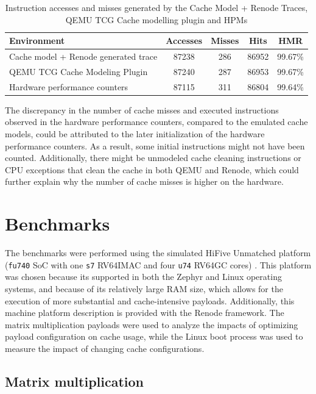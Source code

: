 \begin{table}[h!]
\centering
\begin{tabular}{|l|c|c|c|c|}
\hline
\textbf{Environment} & \textbf{Accesses} & \textbf{Misses} & \textbf{Hits} & \textbf{HMR} \\ \hline
Cache model + Renode generated trace    & 87238        & 286         & 86952 & 99.67\%    \\ \hline
QEMU TCG Cache Modeling Plugin          & 87240        & 287         & 86953 & 99.67\%    \\ \hline
Hardware performance counters           & 87115        & 311         & 86804 & 99.64\%    \\ \hline
\end{tabular}
\caption{Instruction accesses and misses generated by the Cache Model + Renode Traces, QEMU TCG Cache modelling plugin and HPMs}
\label{table:cache_results}
\end{table}

\noindent The discrepancy in the number of cache misses and executed instructions observed in the hardware performance counters, compared to the emulated cache models, could
be attributed to the later initialization of the hardware performance counters. As a result, some initial instructions might not have been counted. Additionally, there might be
unmodeled cache cleaning instructions or CPU exceptions that clean the cache in both QEMU and Renode, which could further explain why the number of cache misses is higher on the
hardware.

\section{Benchmarks}

The benchmarks were performed using the simulated HiFive Unmatched platform (\texttt{fu740} SoC with one \texttt{s7} RV64IMAC and four \texttt{u74} RV64GC cores) \cite{fu740docs}.
This platform was chosen because its supported in both the Zephyr and Linux operating systems, and because of its relatively large RAM size, which allows for the execution of more substantial
and cache-intensive payloads. Additionally, this machine platform description is provided with the Renode framework.
The matrix multiplication payloads were used to analyze the impacts of optimizing payload configuration on cache usage, while the Linux boot process was used to measure the
impact of changing cache configurations.

\subsection{Matrix multiplication}

